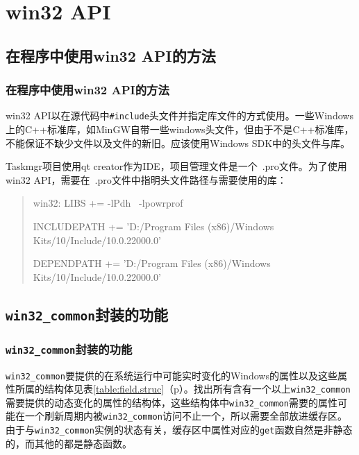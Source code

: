 \documentclass{beamer}
\newcommand\code[1]{\texttt{#1}}
\newcommand\myref[1]{\ref{#1}（p\pageref{#1}）}
\begin{document}
\section{win32 API}
\label{sec:win32api}

\subsection{在程序中使用win32 API的方法}
\begin{frame}
    \frametitle{在程序中使用win32 API的方法}
    win32 API以在源代码中\code{\#include}头文件并指定库文件的方式使用。一些Windows上的C++标准库，如MinGW自带一些windows头文件，但由于不是C++标准库，不能保证不缺少文件以及文件的新旧。应该使用Windows SDK中的头文件与库。

Taskmgr项目使用qt creator作为IDE，项目管理文件是一个\ .pro文件。为了使用win32 API，需要在\ .pro文件中指明头文件路径与需要使用的库：

\begin{quote}
\ttfamily
win32: LIBS += -lPdh \
                -lpowrprof

INCLUDEPATH += 'D:/Program Files (x86)/Windows Kits/10/Include/10.0.22000.0'

DEPENDPATH += 'D:/Program Files (x86)/Windows Kits/10/Include/10.0.22000.0'
\end{quote}
\end{frame}

\subsection{\code{win32\_common}封装的功能}
\begin{frame}
    \frametitle{\code{win32\_common}封装的功能}
    \code{win32\_common}要提供的在系统运行中可能实时变化的Windows的属性以及这些属性所属的结构体见表\myref{table:field.struc}。找出所有含有一个以上\code{win32\_common}需要提供的动态变化的属性的结构体，这些结构体中\code{win32\_common}需要的属性可能在一个刷新周期内被\code{win32\_common}访问不止一个，所以需要全部放进缓存区。由于与\code{win32\_common}实例的状态有关，缓存区中属性对应的\code{get}函数自然是非静态的，而其他的都是静态函数。
\end{frame}
\end{document}
